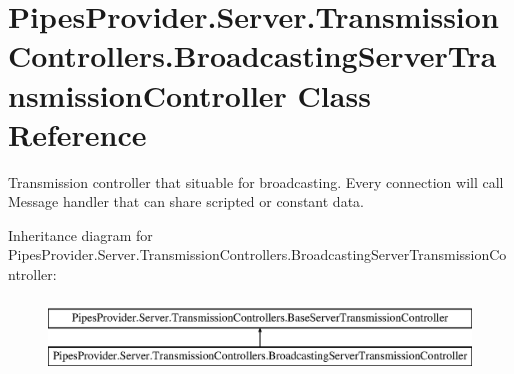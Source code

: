 \hypertarget{class_pipes_provider_1_1_server_1_1_transmission_controllers_1_1_broadcasting_server_transmission_controller}{}\section{Pipes\+Provider.\+Server.\+Transmission\+Controllers.\+Broadcasting\+Server\+Transmission\+Controller Class Reference}
\label{class_pipes_provider_1_1_server_1_1_transmission_controllers_1_1_broadcasting_server_transmission_controller}


Transmission controller that situable for broadcasting. Every connection will call Message handler that can share scripted or constant data.  


Inheritance diagram for Pipes\+Provider.\+Server.\+Transmission\+Controllers.\+Broadcasting\+Server\+Transmission\+Controller\+:\begin{figure}[H]
\begin{center}
\leavevmode
\includegraphics[height=2.000000cm]{db/df3/class_pipes_provider_1_1_server_1_1_transmission_controllers_1_1_broadcasting_server_transmission_controller}
\end{center}
\end{figure}
